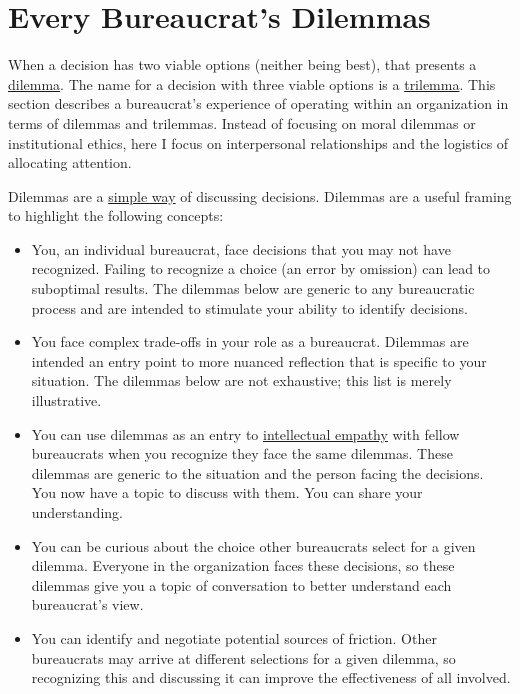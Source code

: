 \section{Every Bureaucrat's  Dilemmas\label{sec:dilemma_trilemma}}



When a decision has two viable options (neither being best), that presents a \href{https://en.wikipedia.org/wiki/Dilemma}{dilemma}. The name for a decision with three viable options is a \href{https://en.wikipedia.org/wiki/Trilemma}{trilemma}. This section describes a bureaucrat's experience of operating within an organization in terms of dilemmas and trilemmas. Instead of focusing on moral dilemmas \cite{2017_Zacka} or institutional ethics, here I focus on interpersonal relationships and the logistics of allocating attention. 

Dilemmas are a \href{https://en.wikipedia.org/wiki/Defeasible_reasoning}{simple way} of discussing decisions. %
Dilemmas are a useful framing to highlight the following concepts:
\begin{itemize}
    \item You, an individual bureaucrat, face decisions that you may not have recognized. Failing to recognize a choice (an error by omission) can lead to suboptimal results. The dilemmas below are generic to any bureaucratic process and are intended to stimulate your ability to identify decisions. 
    \item You face complex trade-offs in your role as a bureaucrat. Dilemmas are intended an entry point to more nuanced reflection that is specific to your situation. The dilemmas below are not exhaustive; this list is merely illustrative. 
    \item You can use dilemmas as an entry to \href{https://en.wikipedia.org/wiki/Theory_of_mind}{intellectual empathy} with fellow bureaucrats when you recognize they face the same dilemmas. These dilemmas are generic to the situation and the person facing the decisions. You now have a topic to discuss with them. You can share your understanding. 
    \item You can be curious about the choice other bureaucrats select for a given dilemma. Everyone in the organization faces these decisions, so these dilemmas give you a topic of conversation to better understand each bureaucrat's view.
    \item You can identify and negotiate potential sources of friction. Other bureaucrats may arrive at different selections for a given dilemma, so recognizing this and discussing it can improve the effectiveness of all involved.
\end{itemize}


